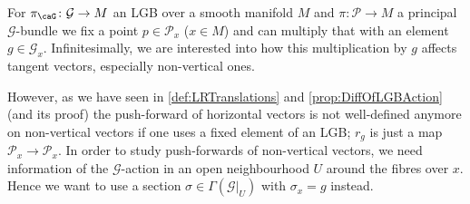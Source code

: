 \documentclass[reqno,a4paper,oneside]{amsart}
\theoremstyle{plain}
\theoremstyle{remark}
\theoremstyle{definition}
\begin{document}
\begin{center}
\end{center}

For $\pi_\caG\colon\mathcal{G} \to M$ an LGB over a smooth manifold $M$ and $\pi\colon\mathcal{P} \to M$ a principal $\mathcal{G}$-bundle we fix a point $p \in \mathcal{P}_x$ ($x \in M$) and can multiply that with an element $g \in \mathcal{G}_x$. Infinitesimally, we are interested into how this multiplication by $g$ affects tangent vectors, especially non-vertical ones.

However, as we have seen in \ref{def:LRTranslations} and \ref{prop:DiffOfLGBAction} (and its proof) the push-forward of horizontal vectors is not well-defined anymore on non-vertical vectors if one uses a fixed element of an LGB; $r_g$ is just a map $\mathcal{P}_x \to \mathcal{P}_x$. In order to study push-forwards of non-vertical vectors, we need information of the $\mathcal{G}$-action in an open neighbourhood $U$ around the fibres over $x$. Hence we want to use a section $\sigma \in \Gamma(\mathcal{G}|_U)$ with $\sigma_x= g$ instead.
\end{document}
